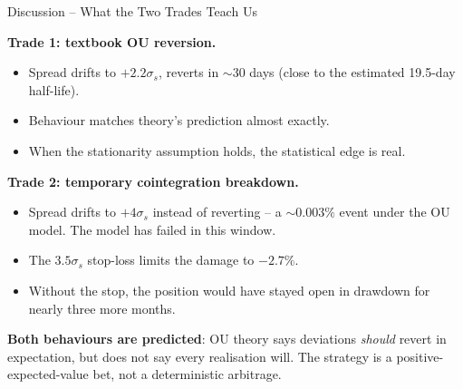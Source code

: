 \documentclass[10pt,aspectratio=169]{beamer}
\begin{document}
\begin{frame}{Discussion -- What the Two Trades Teach Us}

\textbf{Trade 1: textbook OU reversion.}
\begin{itemize}
  \item Spread drifts to $+2.2\sigma_s$, reverts in $\sim$30 days
        (close to the estimated 19.5-day half-life).
  \item Behaviour matches theory's prediction almost exactly.
  \item When the stationarity assumption holds, the statistical edge is real.
\end{itemize}

\bigskip
\textbf{Trade 2: temporary cointegration breakdown.}
\begin{itemize}
  \item Spread drifts to $+4\sigma_s$ instead of reverting -- a $\sim 0.003\%$ event under
        the OU model. The model has failed in this window.
  \item The $3.5\sigma_s$ stop-loss limits the damage to $-2.7\%$.
  \item Without the stop, the position would have stayed open in drawdown for
        nearly three more months.
\end{itemize}

\bigskip
\textbf{Both behaviours are predicted}: OU theory says deviations
\emph{should} revert in expectation, but does not say every realisation will.
The strategy is a positive-expected-value bet, not a deterministic arbitrage.

\end{frame}
\end{document}
